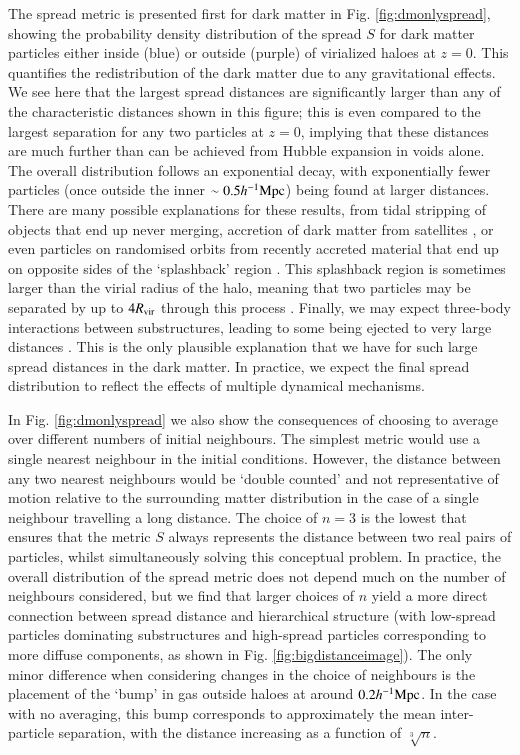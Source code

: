 \documentclass[fleqn,usenatbib]{mnras}
\newcommand{\hmpc}{h^{-1}{\rm Mpc}}
\begin{document}
The spread metric is presented first for dark matter in Fig.
\ref{fig:dmonlyspread}, showing the probability density distribution of the
spread $S$ for dark matter particles either inside (blue) or outside (purple)
of virialized haloes at $z=0$. This quantifies the redistribution of the dark
matter due to any gravitational effects. We see here that the largest spread
distances are significantly larger than any of the characteristic distances
shown in this figure; this is even compared to the largest separation for any
two particles at $z=0$, implying that these distances are much further than
can be achieved from Hubble expansion in voids alone. The overall
distribution follows an exponential decay, with exponentially fewer particles
(once outside the inner $\sim 0.5 \hmpc{}$) being found at larger distances.
There are many possible explanations for these results, from tidal stripping
of objects that end up never merging, accretion of dark matter from
satellites \citep[see e.g. the effects in ][]{VandenBosch2018}, or even
particles on randomised orbits from recently accreted material that end up on
opposite sides of the `splashback' region \citep{Diemer2014, Adhikari2014}.
This splashback region is sometimes larger than the virial radius of the
halo, meaning that two particles may be separated by up to $4R_{\rm vir}$
through this process \citep{Diemer2017a}. Finally, we may expect three-body
interactions between substructures, leading to some being ejected to very
large distances \citep[up to $6R_{\rm vir}$; see][]{Ludlow2009}. This is the
only plausible explanation that we have for such large spread distances in
the dark matter. In practice, we expect the final spread distribution to
reflect the effects of multiple dynamical mechanisms.

In Fig. \ref{fig:dmonlyspread} we also show the consequences of choosing to
average over different numbers of initial neighbours. The simplest metric
would use a single nearest neighbour in the initial conditions. However, the
distance between any two nearest neighbours would be ‘double counted’ and not
representative of motion relative to the surrounding matter distribution in
the case of a single neighbour travelling a long distance. The choice of
$n=3$ is the lowest that ensures that the metric $S$ always represents the
distance between two real pairs of particles, whilst simultaneously solving
this conceptual problem. In practice, the overall distribution of the spread
metric does not depend much on the number of neighbours considered, but we
find that larger choices of $n$ yield a more direct connection between spread
distance and hierarchical structure (with low-spread particles dominating
substructures and high-spread particles corresponding to more diffuse
components, as shown in Fig. \ref{fig:bigdistanceimage}). The only minor difference
when considering changes in the choice of neighbours is the placement of the
`bump' in gas outside haloes at around $0.2\hmpc{}$. In the case with no averaging,
this bump corresponds to approximately the mean inter-particle separation, with
the distance increasing as a function of $\sqrt[3]{n}$.
\end{document}
